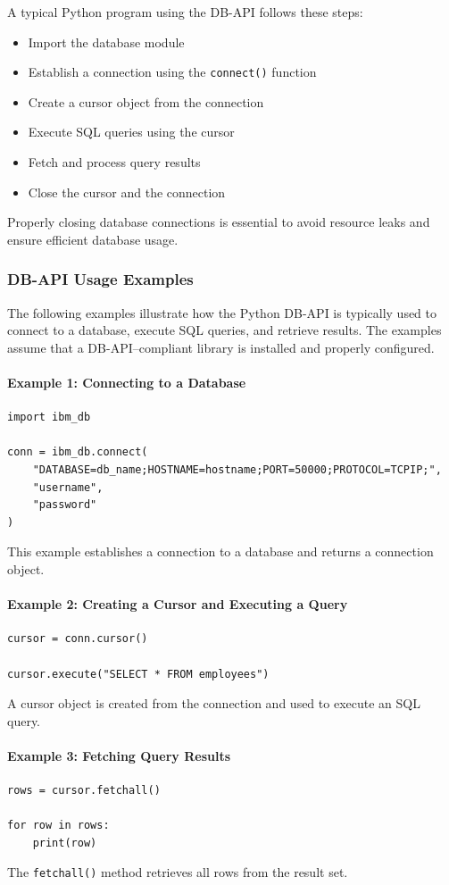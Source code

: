 \documentclass{article}
\begin{document}
A typical Python program using the DB-API follows these steps:
\begin{itemize}
    \item Import the database module
    \item Establish a connection using the \texttt{connect()} function
    \item Create a cursor object from the connection
    \item Execute SQL queries using the cursor
    \item Fetch and process query results
    \item Close the cursor and the connection
\end{itemize}
Properly closing database connections is essential to avoid resource leaks and ensure efficient database usage.


\subsubsection{DB-API Usage Examples}

The following examples illustrate how the Python DB-API is typically used to connect to a database, execute SQL queries, and retrieve results.  
The examples assume that a DB-API–compliant library is installed and properly configured.

\paragraph{Example 1: Connecting to a Database}
\begin{verbatim}
import ibm_db

conn = ibm_db.connect(
    "DATABASE=db_name;HOSTNAME=hostname;PORT=50000;PROTOCOL=TCPIP;",
    "username",
    "password"
)
\end{verbatim}
This example establishes a connection to a database and returns a connection object.

\paragraph{Example 2: Creating a Cursor and Executing a Query}
\begin{verbatim}
cursor = conn.cursor()

cursor.execute("SELECT * FROM employees")
\end{verbatim}
A cursor object is created from the connection and used to execute an SQL query.

\paragraph{Example 3: Fetching Query Results}
\begin{verbatim}
rows = cursor.fetchall()

for row in rows:
    print(row)
\end{verbatim}
The \texttt{fetchall()} method retrieves all rows from the result set.
\end{document}
